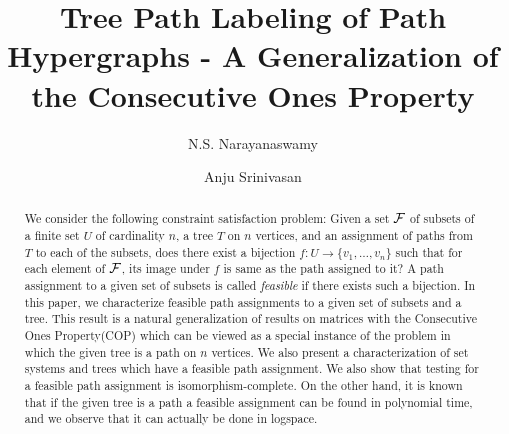 \documentclass{llncs}
\def\cF{{\cal F}}
\newcommand{\rcomment}[1]{}
\begin{document}
\title{Tree Path Labeling of Path Hypergraphs - A Generalization of the Consecutive Ones Property}
\author{N.S. Narayanaswamy  \and Anju Srinivasan }



\date{}

\maketitle

\begin{abstract}
  \rcomment{Need to overhaul the abstract}
  We consider the following constraint satisfaction problem: Given a
  set $\cF$ of subsets of a finite set $U$ of cardinality $n$, a tree
  $T$ on $n$ vertices, and an assignment of paths from $T$ to each of
  the subsets, does there exist a bijection $f:U \rightarrow
  \{v_1,\ldots,v_n\}$ such that for each element of $\cF$, its image
  under $f$ is same as the path assigned to it?  A path assignment to
  a given set of subsets is called {\em feasible} if there exists such
  a bijection.  In this paper, we characterize feasible path
  assignments to a given set of subsets and a tree.  This result is a
  natural generalization of results on matrices with the Consecutive
  Ones Property(COP) which can be viewed as a special instance of the
  problem in which the given tree is a path on $n$ vertices.  We also
  present a characterization of set systems and trees which have a
  feasible path assignment.  We also show that testing for a feasible
  path assignment is isomorphism-complete.  On the other hand, it is
  known that if the given tree is a path a feasible assignment can be
  found in polynomial time, and we observe that it can actually be
  done in logspace.
\end{abstract}
\end{document}
